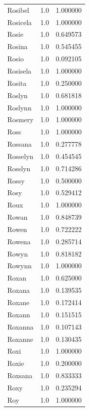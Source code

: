 \documentclass[
  letterpaper,
  DIV=11,
  numbers=noendperiod]{scrreprt}
\begin{document}
\begin{tabular}{lrr}
Rosibel         &   1.0 &   1.000000 \\
Rosicela        &   1.0 &   1.000000 \\
Rosie           &   1.0 &   0.649573 \\
Rosina          &   1.0 &   0.545455 \\
Rosio           &   1.0 &   0.092105 \\
Rosisela        &   1.0 &   1.000000 \\
Rosita          &   1.0 &   0.250000 \\
Roslyn          &   1.0 &   0.681818 \\
Roslynn         &   1.0 &   1.000000 \\
Rosmery         &   1.0 &   1.000000 \\
Ross            &   1.0 &   1.000000 \\
Rossana         &   1.0 &   0.277778 \\
Rosselyn        &   1.0 &   0.454545 \\
Rosslyn         &   1.0 &   0.714286 \\
Rossy           &   1.0 &   0.500000 \\
Rosy            &   1.0 &   0.529412 \\
Roux            &   1.0 &   1.000000 \\
Rowan           &   1.0 &   0.848739 \\
Rowen           &   1.0 &   0.722222 \\
Rowena          &   1.0 &   0.285714 \\
Rowyn           &   1.0 &   0.818182 \\
Rowynn          &   1.0 &   1.000000 \\
Roxan           &   1.0 &   0.625000 \\
Roxana          &   1.0 &   0.139535 \\
Roxane          &   1.0 &   0.172414 \\
Roxann          &   1.0 &   0.151515 \\
Roxanna         &   1.0 &   0.107143 \\
Roxanne         &   1.0 &   0.130435 \\
Roxi            &   1.0 &   1.000000 \\
Roxie           &   1.0 &   0.200000 \\
Roxsana         &   1.0 &   0.833333 \\
Roxy            &   1.0 &   0.235294 \\
Roy             &   1.0 &   1.000000 \\

\end{tabular}
\end{document}
